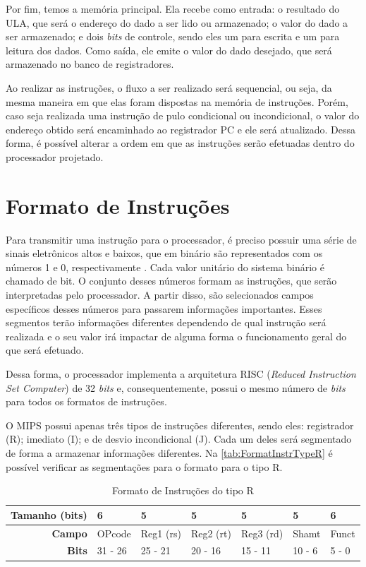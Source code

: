 \documentclass[
	12pt,				%
	oneside,
	a4paper,			%
	english,			%
	french,				%
	spanish,			%
	brazil,				%
	]{abntex2}
\begin{document}
Por fim, temos a memória principal. Ela recebe como entrada: o resultado do ULA, que será o endereço do dado a ser lido ou armazenado; o valor do dado a ser armazenado; e dois \emph{bits} de controle, sendo eles um para escrita e um para leitura dos dados. Como saída, ele emite o valor do dado desejado, que será armazenado no banco de registradores.

Ao realizar as instruções, o fluxo a ser realizado será sequencial, ou seja, da mesma maneira em que elas foram dispostas na memória de instruções. Porém, caso seja realizada uma instrução de pulo condicional ou incondicional, o valor do endereço obtido será encaminhado ao registrador PC e ele será atualizado. Dessa forma, é possível alterar a ordem em que as instruções serão efetuadas dentro do processador projetado. 

\section{Formato de Instruções}
Para transmitir uma instrução para o processador, é preciso possuir uma série de sinais eletrônicos altos e baixos, que em binário são representados com os números 1 e 0, respectivamente \cite{patterson2017}. Cada valor unitário do sistema binário é chamado de bit. O conjunto desses números formam as instruções, que serão interpretadas pelo processador. A partir disso, são selecionados campos específicos desses números para passarem informações importantes. Esses segmentos terão informações diferentes dependendo de qual instrução será realizada e o seu valor irá impactar de alguma forma o funcionamento geral do que será efetuado.

Dessa forma, o processador implementa a arquitetura RISC (\emph{Reduced Instruction Set Computer}) de 32 \emph{bits} e, consequentemente,  possui o mesmo número de \emph{bits} para todos os formatos de instruções.

O MIPS possui apenas três tipos de instruções diferentes, sendo eles: registrador (R); imediato (I); e de desvio incondicional (J). Cada um deles será segmentado de forma a armazenar informações diferentes. Na \autoref{tab:FormatInstrTypeR} é possível verificar as segmentações para o formato para o tipo R.

\begin{table}[H]
\centering
\ABNTEXfontereduzida
\caption{Formato de Instruções do tipo R} \label{tab:FormatInstrTypeR}
\begin{tabular}{r|p{1.7cm}|p{1.7cm}|p{1.7cm}|p{1.7cm}|p{1.7cm} | p{1.5cm}} 
\textbf{Tamanho (bits)} & 6 & 5 & 5 & 5 & 5 & 6 \\ \hline
\textbf{Campo} & OPcode & Reg1 (rs) & Reg2 (rt) & Reg3 (rd) & Shamt & Funct \\ \hline
\textbf{Bits} & 31 - 26 & 25 - 21 & 20 - 16 & 15 - 11 & 10 - 6 & 5 - 0\\
\end{tabular}
\end{table}
\end{document}
